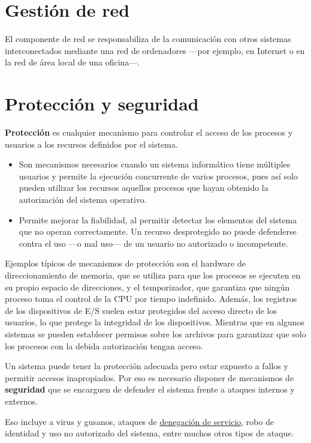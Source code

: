 \section{Gestión de red}\label{_gestiuxf3n_de_red}

{} El componente de red se responsabiliza de la comunicación con otros
sistemas interconectados mediante una red de ordenadores ---por ejemplo,
en Internet o en la red de área local de una oficina---.

\section{Protección y seguridad}\label{_protecciuxf3n_y_seguridad}

\textbf{Protección}{} es cualquier mecanismo para controlar el acceso de
los procesos y usuarios a los recursos definidos por el sistema.

\begin{itemize}
\item
  Son mecanismos necesarios cuando un sistema informático tiene
  múltiples usuarios y permite la ejecución concurrente de varios
  procesos, pues así solo pueden utilizar los recursos aquellos procesos
  que hayan obtenido la autorización del sistema operativo.
\item
  Permite mejorar la fiabilidad, al permitir detectar los elementos del
  sistema que no operan correctamente. Un recurso desprotegido no puede
  defenderse contra el uso ---o mal uso--- de un usuario no autorizado o
  incompetente.
\end{itemize}

Ejemplos típicos de mecanismos de protección son el hardware de
direccionamiento de memoria, que se utiliza para que los procesos se
ejecuten en su propio espacio de direcciones, y el temporizador, que
garantiza que ningún proceso toma el control de la CPU por tiempo
indefinido. Además, los registros de los dispositivos de E/S suelen
estar protegidos del acceso directo de los usuarios, lo que protege la
integridad de los dispositivos. Mientras que en algunos sistemas se
pueden establecer permisos sobre los archivos para garantizar que solo
los procesos con la debida autorización tengan acceso.

Un sistema puede tener la protección adecuada pero estar expuesto a
fallos y permitir accesos inapropiados. Por eso es necesario disponer de
mecanismos de \textbf{{}seguridad} que se encarguen de defender el
sistema frente a ataques internos y externos.

Eso incluye a virus y gusanos, ataques de
\href{https://es.wikipedia.org/wiki/Ataque_de_denegaci\%C3\%B3n_de_servicio}{denegación
de servicio}, robo de identidad y uso no autorizado del sistema, entre
muchos otros tipos de ataque.
